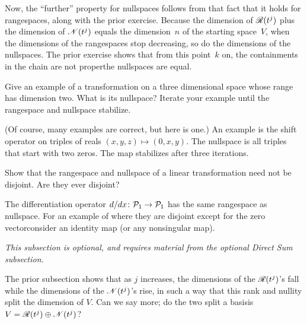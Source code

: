 \begin{exercises}
\begin{answer}
      Now, 
      the ``further'' property for nullspaces follows from that fact
      that it holds for rangespaces, along with the prior exercise.
      Because the dimension of $\mathscr{R}(t^j)$ plus the dimension of
      $\mathscr{N}(t^j)$ equals the dimension~$n$ of the starting space~$V$,
      when the dimensions of the rangespaces stop decreasing, so do the
      dimensions of the nullspaces.
      The prior exercise shows that from this point~$k$ on, 
      the containments in the chain are not proper\Dash the nullspaces 
      are equal. 
    \end{answer}
\item
    Give an example of a transformation on a three
    dimensional space whose range has dimension two.
    What is its nullspace?
    Iterate your example until the rangespace and nullspace stabilize.
    \begin{answer}
      (Of course, many examples are correct, but here is one.) 
      An example is the shift operator on triples of reals
      \( (x,y,z)\mapsto (0,x,y) \).
      The nullspace is all triples that start with two zeros.
      The map stabilizes after three iterations.
     \end{answer}
  \item 
      Show that the rangespace and nullspace of a linear transformation
      need not be disjoint.
      Are they ever disjoint?
      \begin{answer}
        The differentiation operator
        \( \mbox{$d/dx\colon \mathcal{P}_1\to \mathcal{P}_1$} \) has the same
        rangespace as nullspace.
        For an example of where they are disjoint\Dash
        except for the zero vector\Dash consider an identity map
        (or any nonsingular map). 
      \end{answer}
\end{exercises}

















\noindent\textit{This subsection is optional, and requires material from the 
    optional Direct Sum subsection.}

The prior subsection shows that as \( j \) increases,
the dimensions of the $\mathscr{R}(t^j)$'s fall while
the dimensions of the $\mathscr{N}(t^j)$'s rise, 
in such a way that this rank and nullity split the dimension of $V$.
Can we say more;
do the two split a basis\Dash is
\( V=\mathscr{R}(t^j)\oplus\mathscr{N}(t^j) \)?


